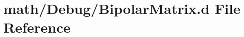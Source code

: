 \hypertarget{_bipolar_matrix_8d}{\section{math/\+Debug/\+Bipolar\+Matrix.d File Reference}
\label{_bipolar_matrix_8d}
}
